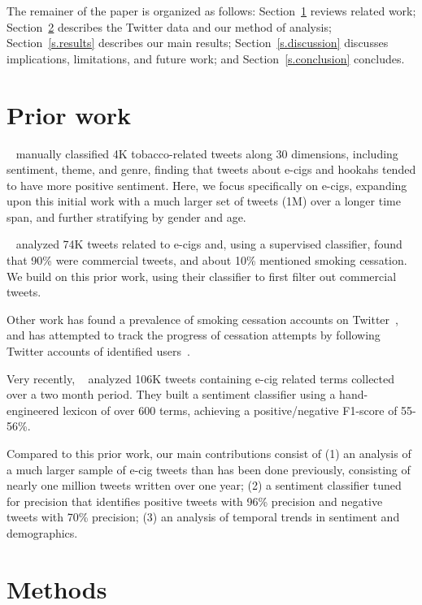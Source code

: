\documentclass{sig-alternate}
\newcommand{\citenoun}[1]{{\citeauthor{#1}~\cite{#1}}}
\begin{document}
The remainer of the paper is organized as follows: Section~\ref{s.prior}
reviews related work; Section~\ref{s.methods} describes the Twitter data and
our method of analysis; Section~\ref{s.results} describes our main results;
Section~\ref{s.discussion} discusses implications, limitations, and future
work; and Section~\ref{s.conclusion} concludes.


\section{Prior work}
\label{s.prior}

\citenoun{myslin2013using} manually classified 4K tobacco-related tweets
along 30 dimensions, including sentiment, theme, and genre, finding that
tweets about e-cigs and hookahs tended to have more positive sentiment. Here,
we focus specifically on e-cigs, expanding upon this initial work with a much
larger set of tweets (1M) over a longer time span, and further
stratifying by gender and age.

\citenoun{huang2014cross} analyzed 74K tweets related to e-cigs and,
using a supervised classifier, found that 90\% were commercial tweets, and
about 10\% mentioned smoking cessation. We build on this prior work, using
their classifier to first filter out commercial tweets.

Other work has found a prevalence of smoking cessation accounts on
Twitter~\cite{prochaska2012twitter}, and has attempted to track the progress
of cessation attempts by following Twitter accounts of identified
users~\cite{murnane2014unraveling}.

Very recently, \citenoun{godea2015analysis} analyzed 106K tweets containing
e-cig related terms collected over a two month period. They built a sentiment
classifier using a hand-engineered lexicon of over 600 terms, achieving a
positive/negative F1-score of 55-56\%.

Compared to this prior work, our main contributions consist of (1) an analysis
of a much larger sample of e-cig tweets than has been done previously,
consisting of nearly one million tweets written over one year; (2) a sentiment
classifier tuned for precision that identifies positive tweets with 96\%
precision and negative tweets with 70\% precision; (3) an analysis of temporal
trends in sentiment and demographics.

\section{Methods}
\label{s.methods}
\end{document}
